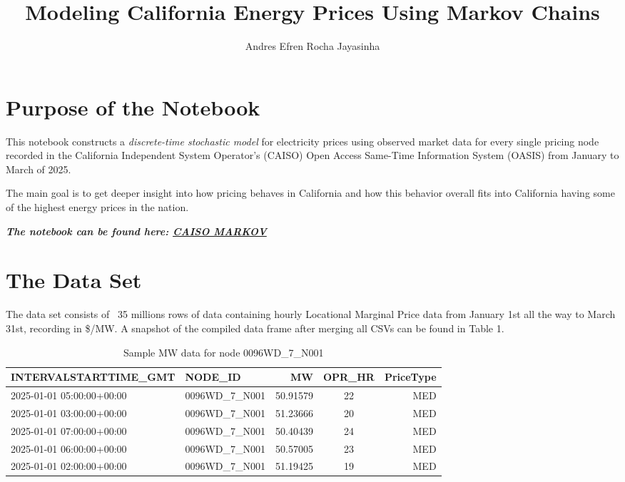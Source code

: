 \documentclass[11pt]{article}
\title{Modeling California Energy
Prices Using Markov Chains}
\author{Andres Efren Rocha Jayasinha}
\date{}
\begin{document}
\maketitle

\section{Purpose of the Notebook}

This notebook constructs a \emph{discrete-time stochastic model} for electricity prices using observed market data for every single pricing node recorded in the California Independent System Operator's (CAISO) Open Access Same-Time Information System (OASIS) from January to March of 2025.


\noindent The main goal is to get deeper insight into how pricing behaves in California and how this behavior overall fits into California having some of the highest energy prices in the nation.

\noindent \textbf{\textit{The notebook can be found here: \href{https://github.com/arochaja/CAISO_MARKOV}{CAISO MARKOV}}}

\section{The Data Set}

\noindent The data set consists of ~35 millions rows of data containing hourly Locational Marginal Price data from January 1st all the way to March 31st, recording in \$/MW. A snapshot of the compiled data frame after merging all CSVs can be found in Table 1.

\begin{table}[h!]
\centering
\begin{tabular}{llrcr}
\hline
\textbf{INTERVALSTARTTIME\_GMT} & \textbf{NODE\_ID} & \textbf{MW} & \textbf{OPR\_HR} & \textbf{PriceType} \\
\hline
2025-01-01 05:00:00+00:00 & 0096WD\_7\_N001 & 50.91579 & 22 & MED \\
2025-01-01 03:00:00+00:00 & 0096WD\_7\_N001 & 51.23666 & 20 & MED \\
2025-01-01 07:00:00+00:00 & 0096WD\_7\_N001 & 50.40439 & 24 & MED \\
2025-01-01 06:00:00+00:00 & 0096WD\_7\_N001 & 50.57005 & 23 & MED \\
2025-01-01 02:00:00+00:00 & 0096WD\_7\_N001 & 51.19425 & 19 & MED \\
\hline
\end{tabular}
\caption{Sample MW data for node 0096WD\_7\_N001}
\label{tab:mw_data_sample}
\end{table}
\end{document}
